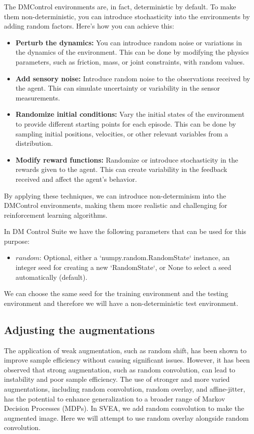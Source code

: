 The DMControl environments are, in fact, deterministic by default. To make them non-deterministic, you can introduce stochasticity into the environments by adding random factors. Here's how you can achieve this:
\begin{itemize}
    \item \textbf{Perturb the dynamics:} You can introduce random noise or variations in the dynamics of the environment. This can be done by modifying the physics parameters, such as friction, mass, or joint constraints, with random values.

    \item \textbf{Add sensory noise:} Introduce random noise to the observations received by the agent. This can simulate uncertainty or variability in the sensor measurements.

    \item \textbf{Randomize initial conditions:} Vary the initial states of the environment to provide different starting points for each episode. This can be done by sampling initial positions, velocities, or other relevant variables from a distribution.

    \item \textbf{Modify reward functions:} Randomize or introduce stochasticity in the rewards given to the agent. This can create variability in the feedback received and affect the agent's behavior.
    
\end{itemize}


By applying these techniques, we can introduce non-determinism into the DMControl environments, making them more realistic and challenging for reinforcement learning algorithms.

In DM Control Suite we have the following parameters that can be used for this purpose:
\begin{itemize}
    \item $random$: Optional, either a `numpy.random.RandomState` instance, an integer
        seed for creating a new `RandomState`, or None to select a seed automatically (default).
\end{itemize}
We can choose the same seed for the training environment and the testing environment and therefore we will have a non-deterministic test environment.


\subsection{Adjusting the augmentations}
The application of weak augmentation, such as random shift, has been shown to improve sample efficiency without causing significant issues. However, it has been observed that strong augmentation, such as random convolution, can lead to instability and poor sample efficiency. The use of stronger and more varied augmentations, including random convolution, random overlay, and affine-jitter, has the potential to enhance generalization to a broader range of Markov Decision Processes (MDPs). 
In SVEA, we add random convolution to make the augmented image. Here we will attempt to use random overlay alongside random convolution.